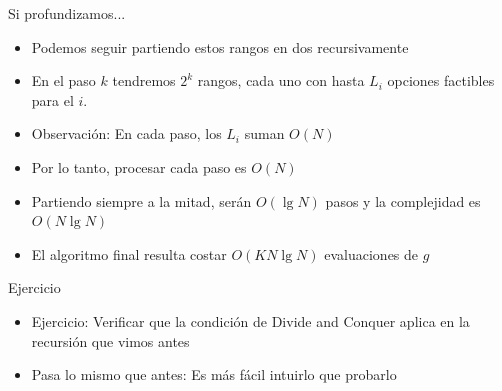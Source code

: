 \documentclass{beamer}
\begin{document}
\begin{frame}{Si profundizamos...}
    \begin{itemize}
		\item Podemos seguir partiendo estos rangos en dos recursivamente
		\item En el paso $k$ tendremos $2^k$ rangos, cada uno con hasta $L_i$ opciones factibles para el $i$.
		\item Observación: En cada paso, los $L_i$ suman $O(N)$
		\item Por lo tanto, procesar cada paso es $O(N)$
		\item Partiendo siempre a la mitad, serán $O(\lg N)$ pasos y la complejidad es $O(N \lg N)$
		\item El algoritmo final resulta costar $O(KN\lg N)$ evaluaciones de $g$
    \end{itemize}
\end{frame}



\begin{frame}{Ejercicio}
    \begin{itemize}
		\item Ejercicio: Verificar que la condición de Divide and Conquer aplica en la recursión que vimos antes 
		\item Pasa lo mismo que antes: Es más fácil intuirlo que probarlo
    \end{itemize}
\end{frame}
\end{document}
